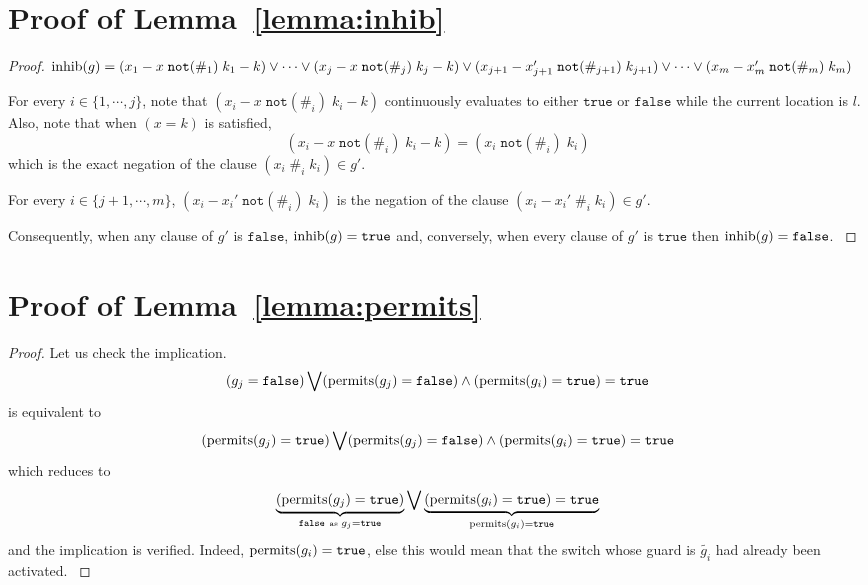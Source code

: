 
\section{Proof of Lemma~\ref{lemma:inhib}}


\begin{proof}
$\operatorname{inhib}(g) =
    (x_1 - x \;\mathtt{not}(\#_1)\; k_1 - k) \vee 
    \cdots \vee 
    (x_j - x \;\mathtt{not}(\#_j)\; k_j - k) \vee
    (x_{j+1} - x_{j+1}' \;\mathtt{not}(\#_{j+1})\; k_{j+1}) \vee
    \cdots \vee 
    (x_{m} - x_{m}' \;\mathtt{not}(\#_{m})\; k_{m})$

For every $i \in \{1, \cdots, j \}$, note that $(x_i - x \;\mathtt{not}(\#_i)\; k_i - k)$ continuously evaluates to either $\mathtt{true}$ or $\mathtt{false}$ while the current location is $l$. Also, note that when $(x = k)$ is satisfied,
$$(x_i - x \;\mathtt{not}(\#_i)\; k_i - k) = (x_i \;\mathtt{not}(\#_i)\; k_i)$$
which is the exact negation of the clause $(x_i \;\#_i\; k_i) \in g'$.

For every $i \in \{j+1, \cdots, m\}$, $(x_{i} - x_{i}' \;\mathtt{not}(\#_{i})\; k_{i})$ is the negation of the clause $(x_{i} - x_{i}' \;\#_{i}\; k_{i}) \in g'$.

Consequently, when any clause of $g'$ is $\mathtt{false}$, $\operatorname{inhib}(g) = \mathtt{true}$ and, conversely, when every clause of $g'$ is $\mathtt{true}$ then $\operatorname{inhib}(g) = \mathtt{false}$.
\label{proof:inhib}
\end{proof}


\section{Proof of Lemma~\ref{lemma:permits}}


\begin{proof}
Let us check the implication.
$$
(g_j = \mathtt{false}) \bigvee (\operatorname{permits}(g_j) = \mathtt{false}) \wedge (\operatorname{permits}(g_i) = \mathtt{true}) = \mathtt{true}
$$
is equivalent to
$$
(\operatorname{permits}(g_j) = \mathtt{true}) \bigvee (\operatorname{permits}(g_j) = \mathtt{false}) \wedge (\operatorname{permits}(g_i) = \mathtt{true}) = \mathtt{true}
$$
which reduces to
$$
\underbrace{(\operatorname{permits}(g_j) = \mathtt{true})}_{\mathtt{false} \mbox{ \tiny{as} } g_j = \mathtt{true}} \bigvee \underbrace{(\operatorname{permits}(g_i) = \mathtt{true}) = \mathtt{true}}_{\operatorname{permits}(g_i) = \mathtt{true}}
$$
and the implication is verified. Indeed, $\operatorname{permits}(g_i) = \mathtt{true}$, else this would mean that the switch whose guard is $\widetilde{g_i}$ had already been activated.
\label{proof:permits}
\end{proof}

